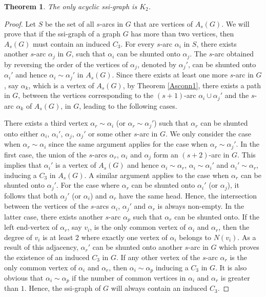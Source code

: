 \documentclass[12pt,a4paper,twoside]{article}
\newtheorem{theorem}{Theorem}[section]
\theoremstyle{casesty}
\theoremstyle{subcasesty}
\theoremstyle{schemesty}
\begin{document}
\begin{theorem} \label{Asacyclic1}
	The only acyclic ssi-graph is $K_{2}$.
\end{theorem}
\begin{proof}
	Let $S$ be the set of all $s$-arcs in $G$ that are vertices of $A_{s}(G)$. We will prove that if the ssi-graph of a graph $G$ has more than two vertices, then $A_{s}(G)$ must contain an induced $C_{3}$. For every $s$-arc $\alpha_{i}$ in $S$, there exists another $s$-arc $\alpha_{j}$ in $G$, such that $\alpha_{i}$ can be shunted onto $\alpha_{j}$. The $s$-arc obtained by reversing the order of the vertices of $\alpha_{j}$, denoted by $\alpha_{j}'$, can be shunted onto $\alpha_{i}'$ and hence $\alpha_{i}\sim \alpha_{j}'$ in $A_{s}(G)$. Since there exists at least one more $s$-arc in $G$, say $\alpha_{k}$, which is a vertex of $A_{s}(G)$, by Theorem \ref{Asconn1}, there exists a path in $G$, between the vertices corresponding to the $(s+1)$-arc $\alpha_{i} \cup \alpha_{j}'$ and the $s$-arc $\alpha_{k}$ of $A_{s}(G)$, in $G$, leading to the following cases.
	
	There exists a third vertex $\alpha_{r} \sim \alpha_{i}$ (or $\alpha_{r} \sim \alpha_{j}'$) such that $\alpha_{r}$ can be shunted onto either $\alpha_{i}$, $\alpha_{i}'$, $\alpha_{j}$, $\alpha_{j}'$ or some other $s$-arc in $G$. We only consider the case when $\alpha_{r} \sim \alpha_{i}$ since the same argument applies for the case when $\alpha_{r} \sim \alpha_{j}'$. In the first case, the union of the $s$-arcs $\alpha_{r}$, $\alpha_{i}$ and $\alpha_{j}$ form an $(s+2)$-arc in $G$. This implies that $\alpha_{i}'$ is a vertex of $A_{s}(G)$ and hence $\alpha_{i} \sim \alpha_{r}$, $\alpha_{i} \sim \alpha_{i}'$ and $\alpha_{i}' \sim \alpha_{r}$, inducing a $C_{3}$ in $A_{s}(G)$. A similar argument applies to the case when $\alpha_{r}$ can be shunted onto $\alpha_{j}'$. For the case where $\alpha_{r}$ can be shunted onto $\alpha_{i}'$ (or $\alpha_{j}$), it follows that both $\alpha_{j}'$ (or $\alpha_{i}$) and $\alpha_{r}$ have the same head. Hence, the intersection between the vertices of the $s$-arcs $\alpha_{i}$, $\alpha_{j}'$ and $\alpha_{r}$ is always non-empty. In the latter case, there exists another $s$-arc $\alpha_{p}$ such that $\alpha_{r}$ can be shunted onto. If the left end-vertex of $\alpha_{r}$, say $v_{i}$, is the only common vertex of $\alpha_{i}$ and $\alpha_{r}$, then the degree of $v_{i}$ is at least $2$ where exactly one vertex of $\alpha_{i}$ belongs to $N(v_{i})$. As a result of this adjacency, $\alpha_{r}'$ can be shunted onto another $s$-arc in $G$ which proves the existence of an induced $C_{3}$ in $G$. If any other vertex of the $s$-arc $\alpha_{r}$ is the only common vertex of $\alpha_{i}$ and $\alpha_{r}$, then $\alpha_{i} \sim \alpha_{p}$ inducing a $C_{3}$ in $G$. It is also obvious that $\alpha_{i} \sim \alpha_{p}$ if the number of common vertices in $\alpha_{i}$ and $\alpha_{r}$ is greater than $1$. Hence, the ssi-graph of $G$ will always contain an induced $C_{3}$.
	

\end{proof}
\end{document}
